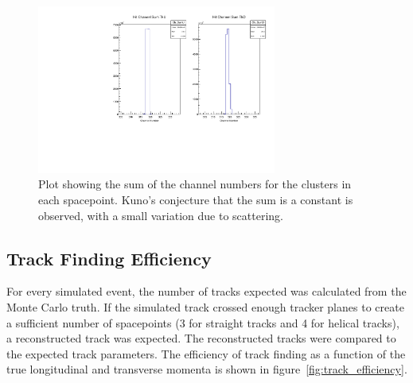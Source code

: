     \begin{figure}[t]
     \centering
     \includegraphics[width=0.7\textwidth, angle=0]{08-Performance/Kuno6mm.pdf}
     \caption{\label{fig:kuno} Plot showing the sum of the channel numbers for the clusters in each spacepoint. Kuno's conjecture that the sum is a constant is observed, with a small variation due to scattering.}
    \end{figure}

  \subsection{Track Finding Efficiency}
  \label{sec:performance:track_finding}

  For every simulated event, the number of tracks expected was calculated from the Monte Carlo truth. If the simulated track crossed enough tracker planes to create a sufficient number of spacepoints (3 for straight tracks and 4 for helical tracks), a reconstructed track was expected. The reconstructed tracks were compared to the expected track parameters. The efficiency of track finding as a function of the true longitudinal and transverse momenta is shown in figure~\ref{fig:track_efficiency}.

